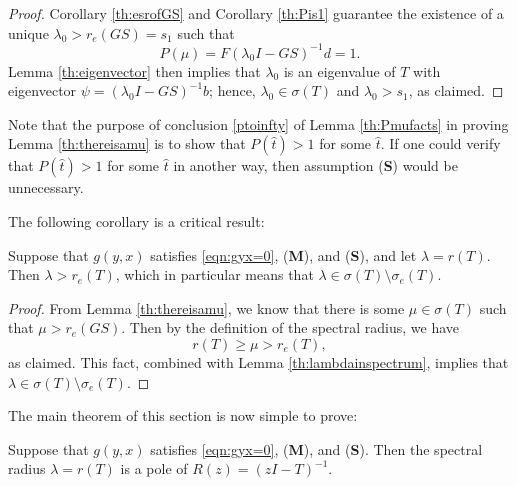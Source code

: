 \begin{proof}
	Corollary \ref{th:esrofGS} and Corollary \ref{th:Pis1} guarantee the existence of a unique $\lambda_0 > r_e(GS) = s_1$ such that
	\[P(\mu) = F(\lambda_0 I - GS)^{-1} d = 1.\]
	Lemma \ref{th:eigenvector} then implies that $\lambda_0$ is an eigenvalue of $T$ with eigenvector $\psi = (\lambda_0 I - GS)^{-1} b$; hence, $\lambda_0 \in \sigma(T)$ and $\lambda_0 > s_1$, as claimed.
	
\end{proof}

Note that the purpose of conclusion \eqref{ptoinfty} of Lemma \ref{th:Pmufacts} in proving Lemma \ref{th:thereisamu} is to show that $P(\hat t) > 1$ for some $\hat t$. If one could verify that $P(\hat t)>1$ for some $\hat t$ in another way, then assumption (\textbf{S}) would be unnecessary.


The following corollary is a critical result:

\begin{corollary} \label{th:rgreaterre}
	Suppose that $g(y, x)$ satisfies \eqref{eqn:gyx=0}, (\textbf{M}), and (\textbf{S}), and let $\lambda = r(T)$. Then $\lambda > r_e(T)$, which in particular means that $\lambda \in \sigma(T) \setminus \sigma_e(T)$.
\end{corollary}

\begin{proof}
	From Lemma \ref{th:thereisamu}, we know that there is some $\mu \in \sigma(T)$ such that $\mu > r_e(GS)$. Then by the definition of the spectral radius, we have
	\[r(T) \geq \mu > r_e(T),\]
	as claimed. This fact, combined with Lemma \ref{th:lambdainspectrum}, implies that $\lambda \in \sigma(T) \setminus \sigma_e(T)$.  
\end{proof}

The main theorem of this section is now simple to prove:

\begin{theorem} \label{th:pole}
	Suppose that $g(y, x)$ satisfies \eqref{eqn:gyx=0}, (\textbf{M}), and (\textbf{S}). Then the spectral radius $\lambda = r(T)$ is a pole of $R(z) = (zI-T)^{-1}$.
\end{theorem}

